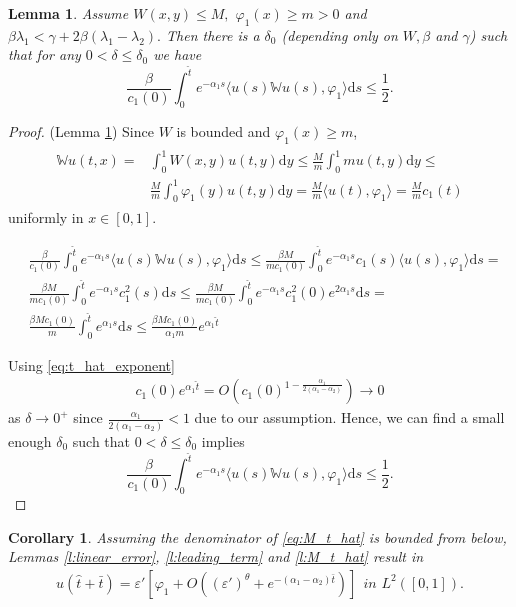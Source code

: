 \documentclass{article}
\renewcommand{\d}{\mathrm{d}}
\newcommand{\W}{\mathbb{W}}
\newcommand{\1}[1]{{\mathds{1}}_{\left\{#1\right\}}}
\newtheorem{lemma}{Lemma}
\newtheorem{corollary}{Corollary}
\begin{document}
\begin{lemma}
\label{l:bounded_W}
Assume $W(x,y) \leq M,$ $\varphi_1(x) \geq m>0$  and $\beta \lambda_1 < \gamma+2 \beta(\lambda_1-\lambda_2).$ Then there is a $\delta_0$ (depending only on $W,\beta$ and $\gamma$) such that 
for any $0<\delta \leq \delta_0$ we have
$$\frac{\beta}{c_1(0)}\int_{0}^{\hat{t}}e^{-\alpha_1 s} \langle u(s)\W u(s), \varphi_1 \rangle \d s \leq \frac{1}{2}.$$
\end{lemma}
\begin{proof} (Lemma \ref{l:bounded_W})
	Since $W$ is bounded and $\varphi_1(x) \geq m$,
	\begin{align}
		\label{eq:Wu_upper_bound}
		\begin{split}
			\W u(t,x)=&\int_{0}^{1} W(x,y)u(t,y) \d y  \leq \frac{M}{m} \int_{0}^{1} m u(t,y) \d y \leq \\
			& \frac{M}{m} \int_{0}^{1} \varphi_1(y) u(t,y) \d y= \frac{M}{m} \langle u(t),\varphi_1 \rangle=\frac{M}{m} c_1(t)
		\end{split}
	\end{align}
	uniformly in $x \in [0,1].$
	
	\begin{align*}
		&\frac{\beta}{c_1(0)}\int_{0}^{\hat{t}}e^{-\alpha_1 s} \langle u(s) \W u(s), \varphi_1 \rangle \d s \leq \frac{\beta M}{mc_1(0) }\int_{0}^{\hat{t}}e^{-\alpha_1 s}c_1(s) \langle u(s) , \varphi_1 \rangle \d s=\\
		&\frac{\beta M}{mc_1(0) }\int_{0}^{\hat{t}}e^{-\alpha_1 s}c_1^2(s) \d s \leq \frac{\beta M}{mc_1(0) }\int_{0}^{\hat{t}}e^{-\alpha_1 s}c_1^2(0)e^{ 2 \alpha_1 s} \d s=\\
		& \frac{\beta Mc_1(0)}{m }\int_{0}^{\hat{t}}e^{  \alpha_1 s} \d s \leq \frac{\beta Mc_1(0)}{ \alpha_1 m }e^{\alpha_1 \hat{t}}
	\end{align*}
	
	Using \eqref{eq:t_hat_exponent}
	\begin{align*}
		c_1(0)e^{\alpha_1 \hat{t}}=O \left(c_1(0)^{1-\frac{\alpha_1}{2(\alpha_1-\alpha_2)}}\right) \to 0
	\end{align*}
	as $\delta \to 0^{+}$ since $\frac{\alpha_1}{2(\alpha_1-\alpha_2)}<1$ due to our assumption. Hence, we can find a small enough $\delta_0$ such that $0<\delta \leq \delta_0$ implies
	$$\frac{\beta}{c_1(0)}\int_{0}^{\hat{t}}e^{-\alpha_1 s} \langle u(s) \W u(s), \varphi_1 \rangle \d s \leq \frac{1}{2}. $$
\end{proof}

\begin{corollary}
Assuming the denominator of \eqref{eq:M_t_hat} is bounded from below, Lemmas \ref{l:linear_error}, \ref{l:leading_term} and \ref{l:M_t_hat} result in
\begin{align}
	\label{eq:epsilon'_level2}
	u(\hat{t}+\bar{t})=\varepsilon' \left[\varphi_1+O\left((\varepsilon')^{\theta}+e^{-(\alpha_1-\alpha_2)\bar{t}} \right) \right] \ \ \textit{in } L^2([0,1]).
\end{align}
\end{corollary}
\end{document}
